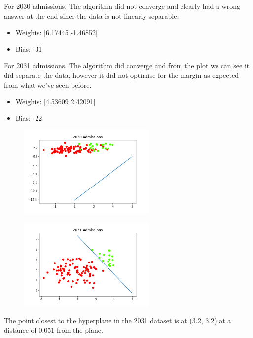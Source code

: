 \documentclass[newpage]{homework}
\begin{document}
\begin{alphaparts}
    \questionpart For 2030 admissions. The algorithm did not converge and clearly had a wrong answer at the end since the data is not linearly separable.
        \begin{itemize}
            \item   Weights: [6.17445 -1.46852]
            \item   Bias: -31
        \end{itemize}
        For 2031 admissions. The algorithm did converge and from the plot we can see it did separate the data, however it did not optimise for the margin as expected from what we've seen before.
        \begin{itemize}
            \item Weights: [4.53609 2.42091]
            \item Bias: -22
        \end{itemize}
        \begin{figure}[h]
            \centering
            \includegraphics[width=0.6\textwidth]{5bi.png}
        \end{figure}
        \begin{figure}[h]
            \centering
            \includegraphics[width=0.6\textwidth]{5bii.png}
        \end{figure}
    \questionpart The point closest to the hyperplane in the 2031 dataset is at (3.2, 3.2) at a distance of 0.051 from the plane.
\end{alphaparts}
\end{document}
